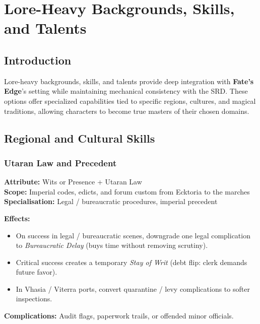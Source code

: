
\chapter{Lore-Heavy Backgrounds, Skills, and Talents}\label{chap:lore_heavy}

\section{Introduction}\label{sec:lore_intro}

Lore-heavy backgrounds, skills, and talents provide deep integration with \textbf{Fate's Edge}'s setting while maintaining mechanical consistency with the SRD. These options offer specialized capabilities tied to specific regions, cultures, and magical traditions, allowing characters to become true masters of their chosen domains.

\section{Regional and Cultural Skills}\label{sec:regional_skills}

\subsection{Utaran Law and Precedent}\label{subsec:utaran_law}

\textbf{Attribute:} Wits or Presence + Utaran Law\\
\textbf{Scope:} Imperial codes, edicts, and forum custom from Ecktoria to the marches\\
\textbf{Specialisation:} Legal / bureaucratic procedures, imperial precedent

\textbf{Effects:}
\begin{itemize}
    \item On success in legal / bureaucratic scenes, downgrade one legal complication to \emph{Bureaucratic Delay} (buys time without removing scrutiny).
    \item Critical success creates a temporary \emph{Stay of Writ} (debt flip: clerk demands future favor).
    \item In Vhasia / Viterra ports, convert quarantine / levy complications to softer inspections.
\end{itemize}
\textbf{Complications:} Audit flags, paperwork trails, or offended minor officials.

